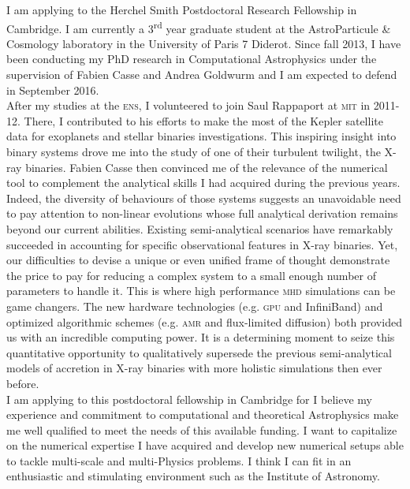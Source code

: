 \documentclass[12pt]{letter}
\begin{document}
\begin{letter} {}
\hspace*{0.5cm} I am applying to the Herchel Smith Postdoctoral Research Fellowship in Cambridge. I am currently a 3\textsuperscript{rd} year graduate student at the AstroParticule \& Cosmology laboratory in the University of Paris 7 Diderot. Since fall 2013, I have been conducting my PhD research in Computational Astrophysics under the supervision of Fabien Casse and Andrea Goldwurm and I am expected to defend in September 2016.\\
\hspace*{0.5cm} After my studies at the \textsc{ens}, I volunteered to join Saul Rappaport at \textsc{mit} in 2011-12. There, I contributed to his efforts to make the most of the Kepler satellite data for exoplanets and stellar binaries investigations. This inspiring insight into binary systems drove me into the study of one of their turbulent twilight, the X-ray binaries. Fabien Casse then convinced me of the relevance of the numerical tool to complement the analytical skills I had acquired during the previous years. Indeed, the diversity of behaviours of those systems suggests an unavoidable need to pay attention to non-linear evolutions whose full analytical derivation remains beyond our current abilities. Existing semi-analytical scenarios have remarkably succeeded in accounting for specific observational features in X-ray binaries. Yet, our difficulties to devise a unique or even unified frame of thought demonstrate the price to pay for reducing a complex system to a small enough number of parameters to handle it. This is where high performance \textsc{mhd} simulations can be game changers. The new hardware technologies (e.g. \textsc{gpu} and InfiniBand) and optimized algorithmic schemes (e.g. \textsc{amr} and flux-limited diffusion) both provided us with an incredible computing power. It is a determining moment to seize this quantitative opportunity to qualitatively supersede the previous semi-analytical models of accretion in X-ray binaries with more holistic simulations then ever before.\\
\hspace*{0.5cm} I am applying to this postdoctoral fellowship in Cambridge for I believe my experience and commitment to computational and theoretical Astrophysics make me well qualified to meet the needs of this available funding. I want to capitalize on the numerical expertise I have acquired and develop new numerical setups able to tackle multi-scale and multi-Physics problems. I think I can fit in an enthusiastic and stimulating environment such as the Institute of Astronomy.\\

\end{letter}
\end{document}
